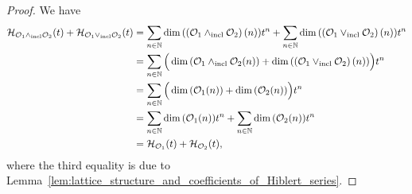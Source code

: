 \begin{proof}
    We have
    \begin{equation}\begin{split}
        \mathcal{H}_{\mathcal{O}_1\wedge_{\mathrm{incl}}\mathcal{O}_2}(t)
        +\mathcal{H}_{\mathcal{O}_1\vee_{\mathrm{incl}}\mathcal{O}_2}(t)&
        =\sum_{n\in\mathbb{N}}\dim{\left(\left(\mathcal{O}_1\wedge_{\mathrm{incl}}\mathcal{O}_2\right)(n)
            \right)}t^n
            +\sum_{n\in\mathbb{N}}\dim{\left(\left(\mathcal{O}_1\vee_{\mathrm{incl}}\mathcal{O}_2\right)
            (n)\right)}t^n\\
        &=\sum_{n\in\mathbb{N}}\Big(\dim{\left(\mathcal{O}_1\wedge_{\mathrm{incl}}\mathcal{O}_2(n)\right)}
            +\dim{\left(\left(\mathcal{O}_1\vee_{\mathrm{incl}}\mathcal{O}_2\right)(n)
        \right)}\Big)t^n\\
        &=\sum_{n\in\mathbb{N}}\Big(\dim{\left(\mathcal{O}_1(n)\right)}
            +\dim{\left(\mathcal{O}_2(n)\right)}\Big)t^n\\
        &=\sum_{n\in\mathbb{N}}\dim{\left(\mathcal{O}_1(n)\right)}t^n+\sum_{n\in\mathbb{N}}
            \dim{\left(\mathcal{O}_2(n)\right)}t^n\\
        &=\mathcal{H}_{\mathcal{O}_1}(t)+\mathcal{H}_{\mathcal{O}_2}(t),
    \end{split}\end{equation}
    where the third equality is due to
    Lemma~\ref{lem:lattice_structure_and_coefficients_of_Hiblert_series}.
\end{proof}
\medbreak

